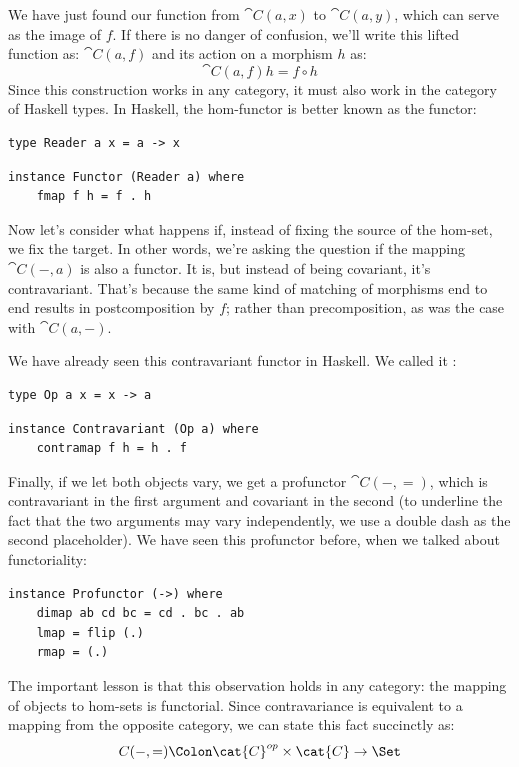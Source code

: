 \noindent
We have just found our function from $\cat{C}(a, x)$ to
$\cat{C}(a, y)$, which can serve as the image of $f$. If there
is no danger of confusion, we'll write this lifted function as: $\cat{C}(a, f)$
and its action on a morphism $h$ as:
\[\cat{C}(a, f) h = f \circ h\]
Since this construction works in any category, it must also work in the
category of Haskell types. In Haskell, the hom-functor is better known
as the  functor:

\begin{Verbatim}
type Reader a x = a -> x
\end{Verbatim}
\begin{Verbatim}
instance Functor (Reader a) where
    fmap f h = f . h
\end{Verbatim}
Now let's consider what happens if, instead of fixing the source of the
hom-set, we fix the target. In other words, we're asking the question if
the mapping $\cat{C}(-, a)$ is also a functor. It is, but instead of being covariant, it's
contravariant. That's because the same kind of matching of morphisms end
to end results in postcomposition by $f$; rather than
precomposition, as was the case with $\cat{C}(a, -)$.

We have already seen this contravariant functor in Haskell. We called it
:

\begin{Verbatim}
type Op a x = x -> a
\end{Verbatim}
\begin{Verbatim}
instance Contravariant (Op a) where
    contramap f h = h . f
\end{Verbatim}
Finally, if we let both objects vary, we get a profunctor
$\cat{C}(-, =)$, which is contravariant in the first argument and
covariant in the second (to underline the fact that the two arguments
may vary independently, we use a double dash as the second placeholder).
We have seen this profunctor before, when we talked about functoriality:

\begin{Verbatim}
instance Profunctor (->) where
    dimap ab cd bc = cd . bc . ab
    lmap = flip (.)
    rmap = (.)
\end{Verbatim}
The important lesson is that this observation holds in any category: the
mapping of objects to hom-sets is functorial. Since contravariance is
equivalent to a mapping from the opposite category, we can state this
fact succinctly as:
\[C(-, =) \Colon \cat{C}^{op} \times \cat{C} \to \Set\]

